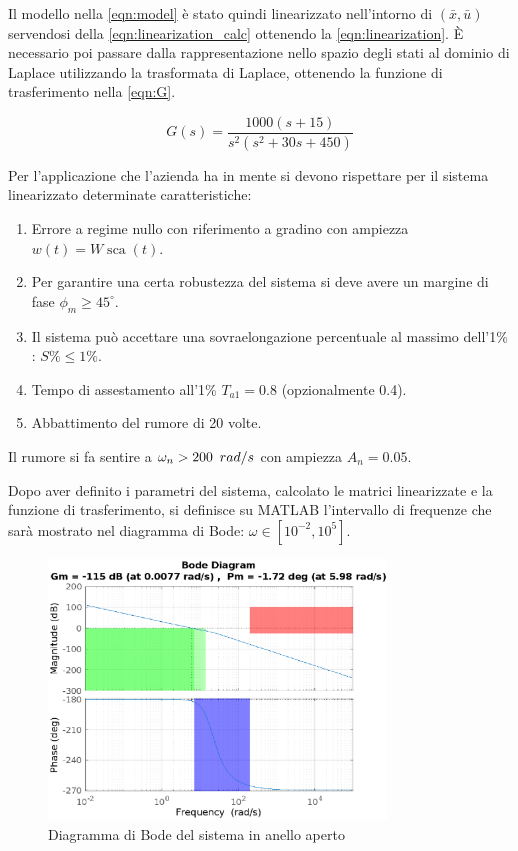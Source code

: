 \documentclass[a4paper]{article}
\DeclareMathOperator*{\sca}{\textrm{sca}}
\begin{document}
Il modello nella \cref{eqn:model} è stato quindi linearizzato nell’intorno di $(\bar{x}, \bar{u})$ servendosi della \cref{eqn:linearization_calc} ottenendo la \cref{eqn:linearization}.
È necessario poi passare dalla rappresentazione nello spazio degli stati al dominio di Laplace utilizzando la trasformata di Laplace, ottenendo la funzione di trasferimento nella \cref{eqn:G}.

\begin{equation}
    \label{eqn:G}
    G(s) = \frac{1000 (s+15)}{s^2 (s^2 + 30s + 450)}
\end{equation}

Per l’applicazione che l’azienda ha in mente si devono rispettare per il sistema linearizzato determinate caratteristiche:
\begin{enumerate}
    \item Errore a regime nullo con riferimento a gradino con ampiezza $w(t) = W \sca(t)$.
    \item Per garantire una certa robustezza del sistema si deve avere un margine di fase $\phi_m \geq 45^\circ$.
    \item Il sistema può accettare una sovraelongazione percentuale al massimo dell’1\% : $S\% \leq 1\%$.
    \item Tempo di assestamento all'1\% $T_{a1} = 0.8$ (opzionalmente 0.4).
    \item Abbattimento del rumore di 20 volte.
\end{enumerate}

Il rumore si fa sentire a $\omega_n > 200\hspace{0.5em} rad/s$ con ampiezza $A_n = 0.05$.
    
Dopo aver definito i parametri del sistema, calcolato le matrici linearizzate e la funzione di trasferimento, si definisce su MATLAB l’intervallo di frequenze che sarà mostrato nel diagramma di Bode: $\omega \in [10^{-2}, 10^5]$.

\begin{figure}[h!]
    \centering
    \includegraphics[width=0.8\textwidth]{bode_G}
    \caption{Diagramma di Bode del sistema in anello aperto}
    \label{fig:bode_G}
\end{figure}
\end{document}
